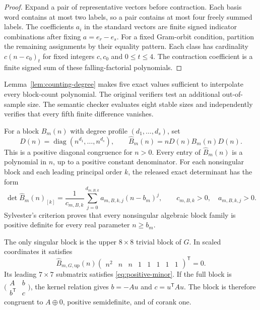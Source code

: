 \documentclass[11pt]{article}
\newcommand{\up}{\mathrm{up}}
\begin{document}
\begin{proof}
Expand a pair of representative vectors before contraction.  Each basis word
contains at most two labels, so a pair contains at most four freely summed
labels.  The coefficients \(a_i\) in the standard vectors are finite signed
indicator combinations after fixing \(a=e_r-e_s\).  For a fixed Gram-orbit
condition, partition the remaining assignments by their equality pattern.
Each class has cardinality \(c(n-c_0)_t\) for fixed integers \(c,c_0\) and
\(0\le t\le4\).  The contraction coefficient is a finite signed sum of these
falling-factorial polynomials.
\end{proof}

Lemma~\ref{lem:counting-degree} makes five exact values sufficient to
interpolate every block-count polynomial.  The original verifiers test an
additional out-of-sample size.  The semantic checker evaluates eight stable
sizes and independently verifies that every fifth finite difference
vanishes.

For a block \(B_m(n)\) with degree profile \((d_1,\ldots,d_s)\), set
\[
 D(n)=\operatorname{diag}(n^{d_1},\ldots,n^{d_s}),
 \qquad
 \widehat B_m(n)=nD(n)B_m(n)D(n).
\]
This is a positive diagonal congruence for \(n>0\).  Every entry of
\(\widehat B_m(n)\) is a polynomial in \(n\), up to a positive constant denominator.  For each nonsingular block and each leading principal order \(k\), the released exact determinant has the form
\begin{equation}\label{eq:positive-minor}
 \det\widehat B_m(n)_{[k]}
 =
 \frac1{c_{m,B,k}}
 \sum_{j=0}^{d_{m,B,k}}
 a_{m,B,k,j}(n-b_m)^j,
 \qquad
 c_{m,B,k}>0,\quad a_{m,B,k,j}>0.
\end{equation}
Sylvester's criterion proves that every nonsingular algebraic block family is positive definite for every real parameter \(n\ge b_m\).

The only singular block is the upper \(8\times8\) trivial block of \(G\).  In scaled coordinates it satisfies
\begin{equation}\label{eq:common-kernel}
 \widehat B_{m,G,\up}(n)
 \begin{pmatrix}n^2&n&n&1&1&1&1&1\end{pmatrix}^{\mathsf T}=0.
\end{equation}
Its leading \(7\times7\) submatrix satisfies \eqref{eq:positive-minor}.  If the full block is
\(\bigl(\begin{smallmatrix}A&b\\b^{\mathsf T}&c\end{smallmatrix}\bigr)\),
the kernel relation gives \(b=-Au\) and \(c=u^{\mathsf T}Au\).  The block is therefore congruent to \(A\oplus0\), positive semidefinite, and of corank one.
\end{document}
